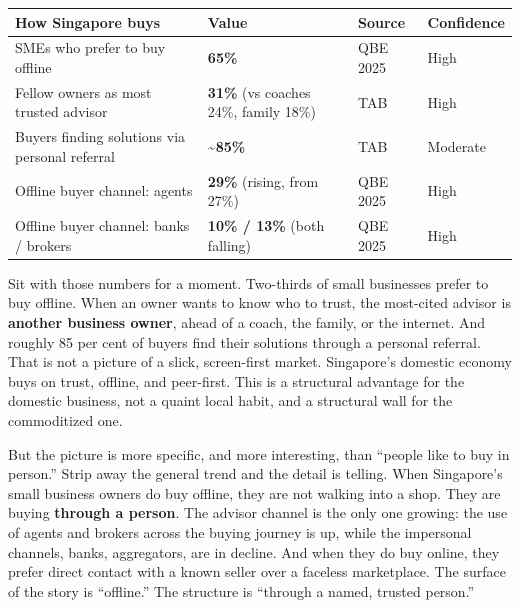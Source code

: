 \documentclass[10pt,twoside,openany]{memoir}
\renewcommand{\arraystretch}{1.1}
\begin{document}
{{{{{{{{{{{{{{\def\LTcaptype{none} %
{\renewcommand{\arraystretch}{0.9}\begin{longtable}[]{@{}
  >{\raggedright\arraybackslash}p{}
  >{\raggedright\arraybackslash}p{}
  >{\raggedright\arraybackslash}p{}
  >{\raggedright\arraybackslash}p{}@{}}
\toprule\noalign{}
\begin{minipage}[b]{\linewidth}\raggedright
How Singapore buys
\end{minipage} & \begin{minipage}[b]{\linewidth}\raggedright
Value
\end{minipage} & \begin{minipage}[b]{\linewidth}\raggedright
Source
\end{minipage} & \begin{minipage}[b]{\linewidth}\raggedright
Confidence
\end{minipage} \\
\midrule\noalign{}
\endhead
\bottomrule\noalign{}
\endlastfoot
SMEs who prefer to buy offline & \textbf{65\%} & QBE 2025 & High \\
Fellow owners as most trusted advisor & \textbf{31\%} (vs coaches 24\%,
family 18\%) & TAB & High \\
Buyers finding solutions via personal referral &
\textbf{\textasciitilde85\%} & TAB & Moderate \\
Offline buyer channel: agents & \textbf{29\%} (rising, from 27\%) & QBE
2025 & High \\
Offline buyer channel: banks / brokers & \textbf{10\% / 13\%} (both
falling) & QBE 2025 & High \\
\end{longtable}
}

Sit with those numbers for a moment. Two-thirds of small businesses
prefer to buy offline. When an owner wants to know who to trust, the
most-cited advisor is \textbf{another business owner}, ahead of a coach,
the family, or the internet. And roughly 85 per cent of buyers find
their solutions through a personal referral. That is not a picture of a
slick, screen-first market. Singapore's domestic economy buys on trust,
offline, and peer-first. This is a structural advantage for the domestic
business, not a quaint local habit, and a structural wall for the
commoditized one.

But the picture is more specific, and more interesting, than ``people
like to buy in person.'' Strip away the general trend and the detail is
telling. When Singapore's small business owners do buy offline, they are
not walking into a shop. They are buying \textbf{through a person}. The
advisor channel is the only one growing: the use of agents and brokers
across the buying journey is up, while the impersonal channels, banks,
aggregators, are in decline. And when they do buy online, they prefer
direct contact with a known seller over a faceless marketplace. The
surface of the story is ``offline.'' The structure is ``through a named,
trusted person.''

}}}}}}}}}}}}}}
\end{document}
